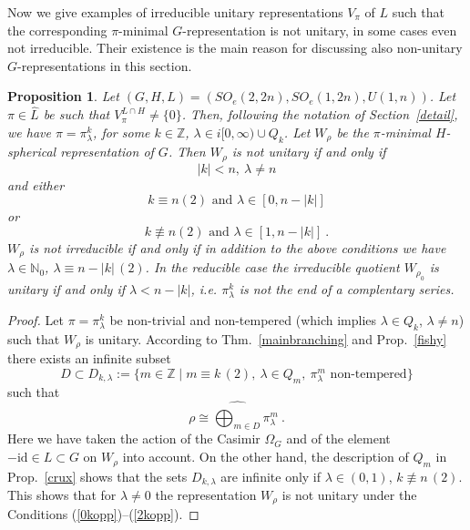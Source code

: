 \documentclass[10]{amsart}
\newtheorem{pro}[thm]{Proposition}
\theoremstyle{remark}
\theoremstyle{definition}
\numberwithin{equation}{section}
\newcommand{\N}{\mathbb{N}}           %
\newcommand{\Z}{\mathbb{Z}}         %
\newcommand{\id}{\mathrm{id}}
\newcommand{\be}{\begin{equation}}
\begin{document}
{Now we give examples of irreducible unitary representations $V_\pi$ of $L$ such that the corresponding $\pi$-minimal $G$-representation
is not unitary, in some cases even not irreducible. Their existence is the main reason for discussing also non-unitary $G$-representations in this section.


\begin{pro}\label{kopp} Let $(G,H,L)=(SO_e(2,2n), SO_e(1,2n), U(1,n))$. Let $\pi\in\widehat L$ be such that $V_\pi^{L\cap H}\ne\{0\}$. Then, following the notation of  
Section~\ref{detail}, we have $\pi=\pi^k_\lambda$, for some $k\in\Z$, $\lambda\in i[0,\infty)\cup Q_k$. Let $W_\rho$ be the $\pi$-minimal $H$-spherical representation of $G$. Then $W_\rho$ is not unitary if and only if 
\be\label{0kopp}|k|< n, \ \lambda\ne n\end{equation} 
and either 
\be \label{1kopp}k\equiv n (2)\mbox{ and }\lambda\in [0,n-|k|]\end{equation} or 
\be\label{2kopp}k\not\equiv n (2)\mbox{ and }
\lambda\in [1,n-|k|]\ .\end{equation} 
$W_\rho$ is not irreducible if and only if in addition to the above conditions we have $\lambda\in\N_0$, $\lambda\equiv n-|k| \, (2)$.
In the reducible case the irreducible quotient $W_{\rho_0}$ is unitary if and only if $\lambda<n-|k|$, i.e. $\pi^k_\lambda$ is not the end of a complentary series.
\end{pro}

\begin{proof} Let $\pi=\pi^k_\lambda$ be non-trivial and non-tempered (which implies $\lambda\in Q_k$, $\lambda\ne n$)  such that $W_\rho$ is unitary. According to Thm.~\ref{mainbranching} and Prop.~\ref{fishy} there exists an infinite subset 
$$D\subset D_{k,\lambda}:=\{m\in\Z\mid m\equiv k\, (2),\: \lambda\in Q_m,\: \pi_\lambda^m \mbox{ non-tempered}\}$$ 
such that 
$$\rho\cong \widehat{\bigoplus_{m\in D}} \pi_\lambda^m\ .$$
Here we have taken the action of the Casimir $\Omega_G$ and of the element $-\id\in L\subset G$ on $W_\rho$ into account.
On the other hand, the description of $Q_m$ in Prop.~\ref{crux} shows that the sets $D_{k,\lambda}$ are infinite only if $\lambda\in (0,1)$, $k\not\equiv n\,(2)$. This shows
that for $\lambda\ne 0$  the representation $W_\rho$ is not unitary under the Conditions (\ref{0kopp})--(\ref{2kopp}). 


\end{proof}}
\end{document}
